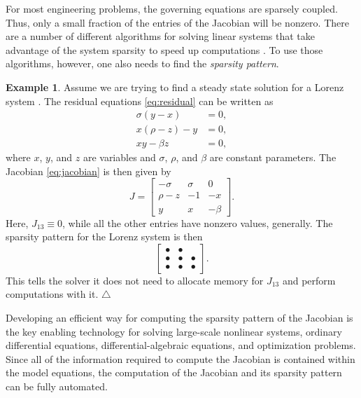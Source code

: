 \documentclass[10pt]{ijnam}
\theoremstyle{definition}
\newtheorem{example}{Example}[section]
\newcommand\xqed[1]{\leavevmode\unskip\penalty9999 \hbox{}\nobreak\hfill \quad\hbox{#1}}
\newcommand{\exampleSymbol}{\xqed{$\triangle$}}
\begin{document}
For most engineering problems, the governing equations are sparsely coupled. Thus, only a small fraction of the entries of the Jacobian will be nonzero. There are a number of different algorithms for solving linear systems that take advantage of the system sparsity to speed up computations \cite{li05,davis2010}. To use those algorithms, however, one also needs to find the \textit{sparsity pattern}.

\begin{example} \label{ex:Lorenz}
Assume we are trying to find a steady state solution for a Lorenz system \cite{lorenz1963}. The residual equations \eqref{eq:residual} can be written as
\begin{equation} \label{eq:lorenz}
    \begin{split}
        \sigma (y - x)   &= 0, \\
        x (\rho - z) - y &= 0, \\
        x y - \beta z    &= 0,
    \end{split}
\end{equation}
where $ x $, $ y $, and $ z $ are variables and $ \sigma $, $ \rho $, and $ \beta $ are constant parameters. The Jacobian \eqref{eq:jacobian} is then given by
\begin{equation} \label{eq:jacobian_lorenz}
 J =
\begin{bmatrix}
    -\sigma  &  \sigma &    0    \\
    \rho - z &  -1     &  -x     \\
    y        &  x      &  -\beta
\end{bmatrix}.
\end{equation}
Here, $J_{13} \equiv 0$, while all the other entries have nonzero values, generally. The sparsity pattern for the Lorenz system is then
\begin{equation} \label{eq:sparsity_pattern}
\begin{bmatrix}
    \bullet & \bullet &         \\
    \bullet & \bullet & \bullet \\
    \bullet & \bullet & \bullet
\end{bmatrix}.
\end{equation}
This tells the solver it does not need to allocate memory for $ J_{13} $ and perform computations with it. \exampleSymbol
\end{example}

Developing an efficient way for computing the sparsity pattern of the Jacobian is the key enabling technology for solving large-scale nonlinear systems, ordinary differential equations, differential-algebraic equations, and optimization problems. Since all of the information required to compute the Jacobian is contained within the model equations, the computation of the Jacobian and its sparsity pattern can be fully automated.
\end{document}
